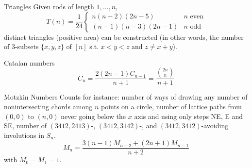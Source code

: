 \begin{algorithm}{Triangles}
\desc
Given rods of length $1, \ldots, n$, 
$$
T(n) = \frac{1}{24}\left\{\begin{array}{ll}
n(n-2)(2n-5) & \textrm{$n$ even}\\
(n-1)(n-3)(2n-1) & \textrm{$n$ odd}
\end{array}\right.$$
distinct triangles (positive area) can be constructed (in other words,
the number of $3$-subsets $\{x,y,z\}$ of $[n]$ s.t. $x < y < z$ and $z
\ne x+y$).
\end{algorithm}




\begin{algorithm}{Catalan numbers}
\desc
$$C_n = \frac{2(2n-1)C_{n-1}}{n+1} = \frac{\binom{2n}{n}}{\scriptstyle
n+1}$$
\end{algorithm}

\begin{algorithm}{Motzkin Numbers}
\desc
Counts for instance: number of ways of drawing any number of
nonintersecting chords among $n$ points on a circle, number of lattice
paths from $(0,0)$ to $(n,0)$ never going below the $x$ axis and using
only steps NE, E and SE, number of $(3412,2413)$-, $(3412,3142)$-, and
$(3412,3412)$-avoiding involutions in $S_n$.
$$
M_n = \frac{3(n-1)M_{n-2} + (2n+1)M_{n-1}}{n+2}
$$
with $M_0 = M_1 = 1$.
\end{algorithm}

